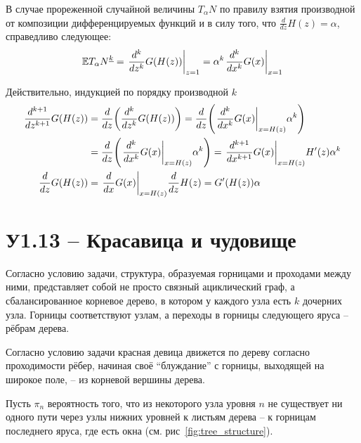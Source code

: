\documentclass[a4paper]{article}
\let\originalleft\left
\let\originalright\right
\renewcommand{\left}{\mathopen{}\mathclose\bgroup\originalleft}
\renewcommand{\right}{\aftergroup\egroup\originalright}
\newcommand{\brac}[1]{{\left ( #1 \right )}}
\newcommand{\induc}[1]{{\left . #1 \right \vert}}
\newcommand{\Ex}[0]{{\mathbb{E}}}
\begin{document}
В случае прореженной случайной величины $T_\alpha N$ по правилу взятия
производной от композиции дифференцируемых функций и в силу того, что
$\frac{d}{dz}H(z) = \alpha$, справедливо следующее: 
\[\Ex {T_\alpha N}^{\underline{k}} = \induc{\frac{d^k}{dz^k} G\brac{H(z)} }_{z=1}
= \alpha^k\induc{\frac{d^k}{dx^k} G(x) }_{x=1}\]

Действительно, индукцией по порядку производной $k$ \begin{align*}
	\frac{d^{k+1}}{dz^{k+1}} G\brac{H(z)} & = \frac{d}{dz}\brac{ \frac{d^k}{dz^k} G\brac{H(z)} } = \frac{d}{dz}\brac{ \induc{\frac{d^k}{dx^k} G(x) }_{x=H(z)} \alpha^k }\\
	& = \frac{d}{dz}\brac{ \induc{\frac{d^k}{dx^k} G(x) }_{x=H(z)} \alpha^k } = \induc{\frac{d^{k+1}}{dx^{k+1}} G(x) }_{x=H(z)} H'(z) \alpha^k\\
	\frac{d}{dz} G\brac{H(z)} & = \induc{\frac{d}{dx} G(x) }_{x=H(z)} \frac{d}{dz} H(z) = G'\brac{H(z)} \alpha
\end{align*}



\section{У1.13 -- Красавица и чудовище} %
\label{sec:task_1_13}

Согласно условию задачи, структура, образуемая горницами и проходами
между ними, представляет собой не просто связный ациклический граф, а
сбалансированное корневое дерево, в котором у каждого узла есть $k$
дочерних узла.
Горницы соответствуют узлам, а переходы в горницы следующего яруса
-- рёбрам дерева.

Согласно условию задачи красная девица движется по дереву согласно
проходимости рёбер, начиная своё ``блуждание'' с горницы, выходящей на
широкое поле, -- из корневой вершины дерева.

Пусть $\pi_n$ вероятность того, что из некоторого узла уровня $n$
не существует ни одного пути через узлы нижних уровней к листьям дерева
-- к горницам последнего яруса, где есть окна (см. рис~\ref{fig:tree_structure}).
\end{document}
